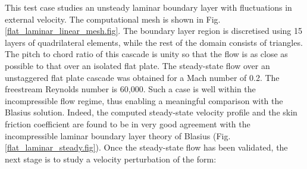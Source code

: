 %
 This test case studies an unsteady laminar
 boundary layer with fluctuations in external velocity.
 The computational mesh is shown in Fig. \ref{flat_laminar_linear_mesh.fig}.
 The boundary layer region is discretised using 15 layers of quadrilateral elements,
 while the rest of the domain consists of triangles.
 The pitch to chord ratio of this cascade is unity so that the flow is
 as close as possible to that over an isolated flat plate.
 The steady-state flow  over an unstaggered flat plate cascade was obtained for
 a Mach number of 0.2.  The freestream Reynolds number is 60,000. Such a case is
 well within the incompressible flow regime, thus enabling  a meaningful comparison
 with the Blasius solution.  Indeed, the computed steady-state  velocity profile and
 the skin friction coefficient are found to be in very good agreement with the
 incompressible laminar boundary layer theory of  Blasius (Fig. \ref{flat_laminar_steady.fig}).
 Once the steady-state flow has been validated, the next stage is to study a
 velocity perturbation of the form:


